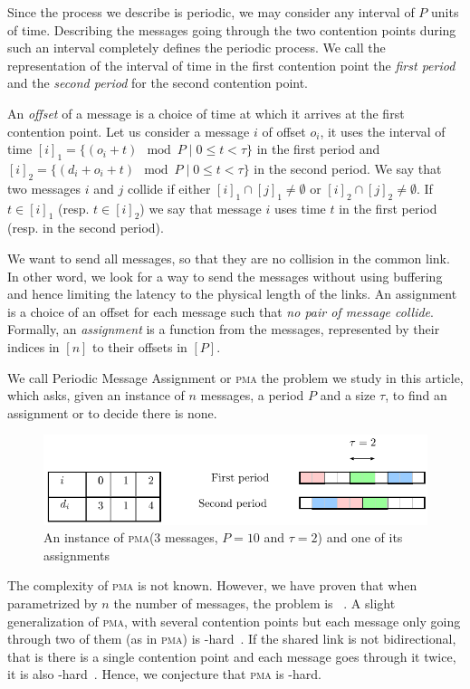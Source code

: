 \documentclass[10pt, conference, letterpaper]{IEEEtran}
\newcommand\pma{\textsc{pma}\xspace}
\begin{document}
Since the process we describe is periodic, we may consider any interval of $P$ units of time.
Describing the messages going through the two contention points during such an interval
completely defines the periodic process. We call the representation of the interval
of time in the first contention point the \emph{first period} and the \emph{second period}
for the second contention point.

An \emph{offset} of a message is a choice of time at which it arrives
at the first contention point. Let us consider a message $i$
of offset $o_i$, it uses the interval of time $[i]_1 = \{ (o_i + t) \mod P \mid 0 \leq t < \tau \}$ in the first period and $[i]_2 = \{ (d_i + o_i + t) \mod P \mid 0 \leq t < \tau \}$ in the second period. We say that two messages $i$ and $j$ collide if either $[i]_1 \cap [j]_1 \neq \emptyset $ or $[i]_2 \cap [j]_2 \neq \emptyset $. If $t \in [i]_1$ (resp. $t \in [i]_2$) we say that message $i$ uses time $t$ in the first period (resp. in the second period).

We want to send all messages, so that they are no collision in the common link.
In other word, we look for a way to send the messages without using buffering and 
hence limiting the latency to the physical length of the links. An assignment is a
choice of an offset for each message such that \emph{no pair of message collide}.
Formally, an \emph{assignment} is a function from the messages, represented by their indices in $[n]$ to their offsets in $[P]$.  

We call Periodic Message Assignment or \pma the problem we study in this article,
which asks, given an instance of $n$ messages, a period $P$ and a size $\tau$, to find 
an assignment or to decide there is none.
\begin{figure}
\begin{center}
\includegraphics[scale=0.7]{instance}
\end{center}
\caption{An instance of \pma ($3$ messages, $P= 10$ and $\tau = 2$) and one of its assignments}
\end{figure}

The complexity of \pma is not known. However, we have proven that when parametrized by
$n$ the number of messages, the problem is \FPT~\cite{barth2018deterministic}.
A slight generalization of \pma, with several contention points but each message only going through two of them (as in \pma) is \NP-hard~\cite{barth2018deterministic}. If the shared link is not bidirectional, that is there is a single contention point and each message goes through it twice, it is also \NP-hard~\cite{orman1997complexity}. Hence, we conjecture that \pma is \NP-hard.
\end{document}
